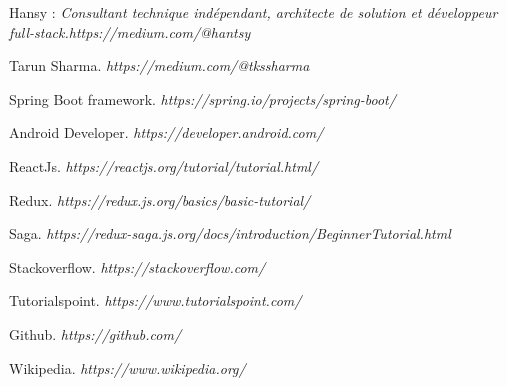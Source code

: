 %
\begin{thebibliography}{20}

Hansy : 
\textit{Consultant technique ind\'ependant, architecte de solution et d\'eveloppeur full-stack.\quad https://medium.com/@hantsy}

Tarun Sharma. 
\textit{https://medium.com/@tkssharma}

Spring Boot framework. 
\textit{https://spring.io/projects/spring-boot/}

Android Developer. 
\textit{https://developer.android.com/}

ReactJs. 
\textit{https://reactjs.org/tutorial/tutorial.html/}

Redux. 
\textit{https://redux.js.org/basics/basic-tutorial/}

Saga. 
\textit{https://redux-saga.js.org/docs/introduction/BeginnerTutorial.html}

 Stackoverflow. 
\textit{https://stackoverflow.com/}

 Tutorialspoint. 
\textit{https://www.tutorialspoint.com/}

 Github. 
\textit{https://github.com/}

 Wikipedia. 
\textit{https://www.wikipedia.org/}






\end{thebibliography}
